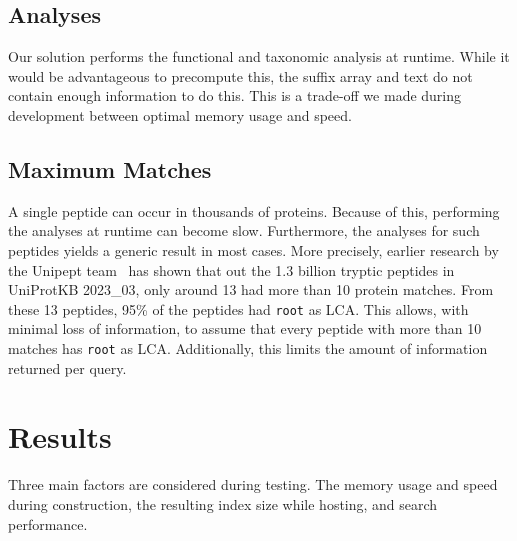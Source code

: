 \documentclass[11pt]{article}
\begin{document}
\begin{multicols}{2}
        \subsection{Analyses}
        Our solution performs the functional and taxonomic analysis at runtime.
        While it would be advantageous to precompute this, the suffix array and text do not contain enough information to do this.
        This is a trade-off we made during development between optimal memory usage and speed.

        \subsection{Maximum Matches}
        A single peptide can occur in thousands of proteins.
        Because of this, performing the analyses at runtime can become slow.
        Furthermore, the analyses for such peptides yields a generic result in most cases.
        More precisely, earlier research by the Unipept team~\cite{unipept_cutoff} has shown that out the 1.3 billion tryptic peptides in UniProtKB 2023\_03, only around 13 had more than 10 protein matches.
        From these 13 peptides, 95\% of the peptides had \texttt{root} as LCA\@.
        This allows, with minimal loss of information, to assume that every peptide with more than 10 matches has \texttt{root} as LCA\@.
        Additionally, this limits the amount of information returned per query.

        \section{Results}\label{sec:results}
        Three main factors are considered during testing.
        The memory usage and speed during construction, the resulting index size while hosting, and search performance.


\end{multicols}
\end{document}
